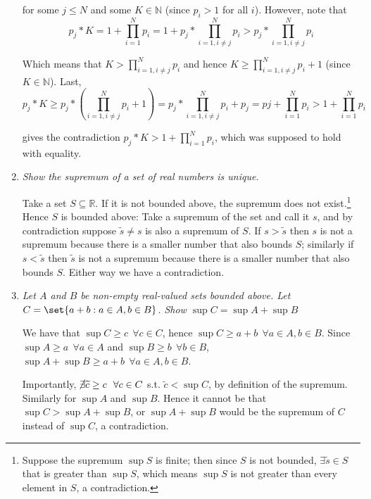 \documentclass{article}
\begin{document}
\begin{enumerate}[1.]
      for some $j \le N$ and some $K \in \mathbb{N}$ (since $p_i > 1$ for all $i$). However, note that
      \[
          p_j * K
          = 1 + \prod_{i = 1}^N p_i
          = 1 + p_j * \prod_{i = 1, i \ne j}^N p_i
          > p_j * \prod_{i = 1, i \ne j}^N p_i
      \]

      Which means that $K > \prod_{i = 1, i \ne j}^N p_i$ and hence $K \ge \prod_{i = 1, i \ne j}^N p_i + 1$ (since $K \in \mathbb{N}$). Last,
      \[
          p_j * K
          \ge p_j * (\prod_{i = 1, i \ne j}^N p_i + 1)
          = p_j * \prod_{i = 1, i \ne j}^N p_i + p_j
          = pj + \prod_{i = 1}^N p_i
          > 1 + \prod_{i = 1}^N p_i
      \]

      gives the contradiction $p_j * K > 1 + \prod_{i = 1}^N p_i$, which was supposed to hold with equality.

  \item \textit{Show the supremum of a set of real numbers is unique.}

    \solution Take a set $S \subseteq \mathbb{R}$. If it is not bounded above, the supremum does not exist.\footnote{Suppose the supremum $\sup S$ is finite; then since $S$ is not bounded, $\exists \widetilde{s} \in S$ that is greater than $\sup S$, which means $\sup S$ is not greater than every element in $S$, a contradiction.} Hence $S$ is bounded above: Take a supremum of the set and call it $s$, and by contradiction suppose $\widetilde{s} \ne s$ is also a supremum of $S$.  If $s > \widetilde{s}$ then $s$ is not a supremum because there is a smaller number that also bounds $S$; similarly if $s < \widetilde{s}$ then $\widetilde{s}$ is not a supremum because there is a smaller number that also bounds $S$. Either way we have a contradiction.

  \item \textit{Let $A$ and $B$ be non-empty real-valued sets bounded above. Let $C = \set{a +b: a \in A, b \in B}$. Show $\sup C = \sup A + \sup B$}

    \solution We have that $\sup C \ge c ~~ \forall c \in C$, hence $\sup C \ge a + b ~~ \forall a \in A, b \in B$.  Since $\sup A \ge a ~~ \forall a \in A$ and $\sup B \ge b ~~ \forall b \in B$, $\sup A + \sup B \ge a + b ~~ \forall a \in A, b \in B$.

      Importantly, $\cancel{\exists} \widetilde{c} \ge c ~~ \forall c \in C$ s.t. $\widetilde{c} < \sup C$, by definition of the supremum. Similarly for $\sup A$ and $\sup B$. Hence it cannot be that $\sup C > \sup A + \sup B$, or $\sup A + \sup B$ would be the supremum of $C$ instead of $\sup C$, a contradiction.


\end{enumerate}
\end{document}
